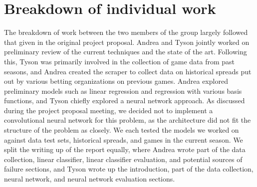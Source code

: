 \documentclass{article}
\begin{document}
\section{Breakdown of individual work}
The breakdown of work between the two members of the group largely followed that given in the original project proposal. Andrea and Tyson jointly worked on preliminary review of the current techniques and the state of the art. Following this, Tyson was primarily involved in the collection of game data from past seasons, and Andrea created the scraper to collect data on historical spreads put out by various betting organizations on previous games. Andrea explored preliminary models such as linear regression and regression with various basis functions, and Tyson chiefly explored a neural network approach. As discussed during the project proposal meeting, we decided not to implement a convolutional neural network for this problem, as the architecture did not fit the structure of the problem as closely. We each tested the models we worked on against data test sets, historical spreads, and games in the current season. We split the writing up of the report equally, where Andrea wrote part of the data collection, linear classifier, linear classifier evaluation, and potential sources of failure sections, and Tyson wrote up the introduction, part of the data collection, neural network, and neural network evaluation sections.
\end{document}
